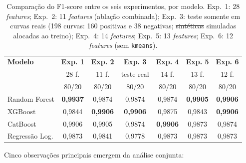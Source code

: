 \documentclass[msc]{on} %
\makeatletter
\providecommand{\DIFaddtex}[1]{{\protect\color{red}#1}} %
\providecommand{\DIFdeltex}[1]{{\protect\color{red}\sout{#1}}} %
\providecommand{\DIFaddFL}[1]{\DIFadd{#1}} %
\providecommand{\DIFdelFL}[1]{\DIFdel{#1}} %
\providecommand{\DIFaddbeginFL}{} %
\providecommand{\DIFaddendFL}{} %
\providecommand{\DIFdelbeginFL}{} %
\providecommand{\DIFdelendFL}{} %
\providecommand{\DIFadd}[1]{\texorpdfstring{\DIFaddtex{#1}}{#1}} %
\providecommand{\DIFdel}[1]{\texorpdfstring{\DIFdeltex{#1}}{}} %
\let\sout@orig\sout %
\renewcommand{\sout}[1]{\ifmmode\text{\sout@orig{\ensuremath{#1}}}\else\sout@orig{#1}\fi} %
\makeatother
\begin{document}
\begin{table}[htbp]
\centering
\caption{Comparação do F1-score entre os seis experimentos, por modelo. Exp.~1: 28 \textit{features}; Exp.~2: 11 \textit{features} (ablação combinada); Exp.~3: teste somente em curvas reais (198 curvas: 160 positivas e 38 negativas; \DIFdelbeginFL \DIFdelFL{sintéticas }\DIFdelendFL \DIFaddbeginFL \DIFaddFL{simuladas }\DIFaddendFL alocadas ao treino); Exp.~4: 14 \textit{features}; Exp.~5: 13 \textit{features}; Exp.~6: 12 \textit{features} (sem \texttt{kmeans}).}
\label{tab:comparacao_f1}
\footnotesize
\begin{tabular}{lcccccc}
\hline
\textbf{Modelo} & \textbf{Exp. 1} & \textbf{Exp. 2} & \textbf{Exp. 3} & \textbf{Exp. 4} & \textbf{Exp. 5} & \textbf{Exp. 6} \\
 & \scriptsize{28 f.} & \scriptsize{11 f.} & \scriptsize{teste real} & \scriptsize{14 f.} & \scriptsize{13 f.} & \scriptsize{12 f.} \\
 & \scriptsize{80/20} & \scriptsize{80/20} & \scriptsize{80/20} & \scriptsize{80/20} & \scriptsize{80/20} & \scriptsize{80/20} \\
\hline
Random Forest   & \textbf{0,9937} & 0,9874 & 0,9874 & 0,9874 & \textbf{0,9905} & \textbf{0,9906} \\
XGBoost         & 0,9844 & \textbf{0,9906} & \textbf{0,9906} & 0,9875 & 0,9843 & \textbf{0,9906} \\
CatBoost        & 0,9906 & 0,9905 & 0,9874 & \textbf{0,9906} & 0,9873 & 0,9874 \\
Regressão Log.  & 0,9873 & 0,9841 & 0,9778 & 0,9873 & 0,9873 & 0,9873 \\
\hline
\end{tabular}
\end{table}

Cinco observações principais emergem da análise conjunta:
\end{document}
